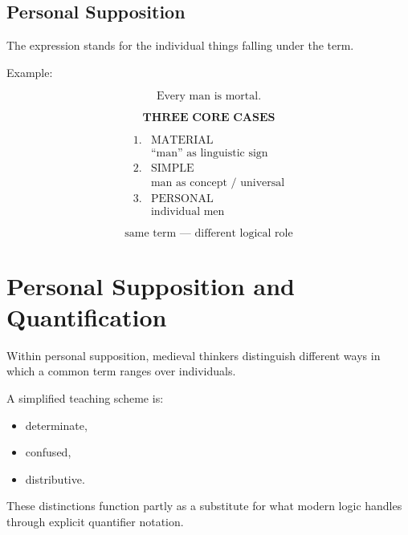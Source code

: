 \documentclass[11pt]{article}
\begin{document}
\subsection*{Personal Supposition}

The expression stands for the individual things falling under the
term.

Example:

\[
\text{Every man is mortal.}
\]

\begin{whiteboard}
\[
\textbf{THREE CORE CASES}
\]

\[
\begin{array}{ll}
1. & \text{MATERIAL}\\
   & \text{``man'' as linguistic sign}\\[0.5em]
2. & \text{SIMPLE}\\
   & \text{man as concept / universal}\\[0.5em]
3. & \text{PERSONAL}\\
   & \text{individual men}
\end{array}
\]

\[
\boxed{\text{same term --- different logical role}}
\]
\end{whiteboard}

\section{Personal Supposition and Quantification}

Within personal supposition, medieval thinkers distinguish
different ways in which a common term ranges over individuals.

A simplified teaching scheme is:

\begin{itemize}
    \item determinate,
    \item confused,
    \item distributive.
\end{itemize}

These distinctions function partly as a substitute for what
modern logic handles through explicit quantifier notation.
\end{document}

